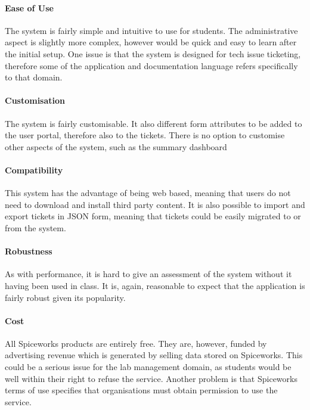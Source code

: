 \paragraph{Ease of Use} 

The system is fairly simple and intuitive to use for students. The administrative aspect is slightly more complex, however would be quick and easy to learn after the initial setup. One issue is that the system is designed for tech issue ticketing, therefore some of the application and documentation language refers specifically to that domain.

\paragraph{Customisation} 

The system is fairly customisable. It also different form attributes to be added to the user portal, therefore also to the tickets. There is no option to customise other aspects of the system, such as the summary dashboard


\paragraph{Compatibility}  

This system has the advantage of being web based, meaning that users do not need to download and install third party content. It is also possible to import and export tickets in JSON form, meaning that tickets could be easily migrated to or from the system.

\paragraph{Robustness}
As with performance, it is hard to give an assessment of the system without it having been used in class. It is, again, reasonable to expect that the application is fairly robust given its popularity.


\paragraph{Cost}  
All Spiceworks products are entirely free. They are, however, funded by advertising revenue which is generated by selling data stored on Spiceworks. This could be a serious issue for the lab management domain, as students would be well within their right to refuse the service. Another problem is that Spiceworks terms of use specifies that organisations must obtain permission to use the service.


